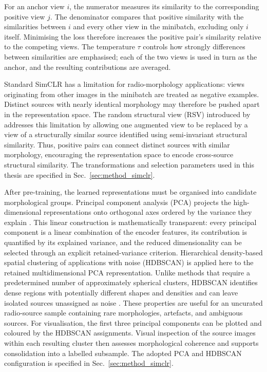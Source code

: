 For an anchor view \(i\), the numerator measures its similarity to the corresponding positive view \(j\). The denominator compares that positive similarity with the similarities between \(i\) and every other view in the minibatch, excluding only \(i\) itself. Minimising the loss therefore increases the positive pair's similarity relative to the competing views. The temperature \(\tau\) controls how strongly differences between similarities are emphasised; each of the two views is used in turn as the anchor, and the resulting contributions are averaged.

Standard SimCLR has a limitation for radio-morphology applications: views originating from other images in the minibatch are treated as negative examples.
Distinct sources with nearly identical morphology may therefore be pushed apart in the representation space.
The random structural view (RSV) introduced by \citet{Nicolas2025} addresses this limitation by allowing one augmented view to be replaced by a view of a structurally similar source identified using semi-invariant structural similarity.
Thus, positive pairs can connect distinct sources with similar morphology, encouraging the representation space to encode cross-source structural similarity.
The transformations and selection parameters used in this thesis are specified in Sec.~\ref{sec:method_simclr}.

After pre-training, the learned representations must be organised into candidate morphological groups.
Principal component analysis (PCA) projects the high-dimensional representations onto orthogonal axes ordered by the variance they explain \citep{Jolliffe2016}.
This linear construction is mathematically transparent: every principal component is a linear combination of the encoder features, its contribution is quantified by its explained variance, and the reduced dimensionality can be selected through an explicit retained-variance criterion.
Hierarchical density-based spatial clustering of applications with noise (HDBSCAN) is applied here to the retained multidimensional PCA representation.
Unlike methods that require a predetermined number of approximately spherical clusters, HDBSCAN identifies dense regions with potentially different shapes and densities and can leave isolated sources unassigned as noise \citep{Campello2013,McInnes2017}.
These properties are useful for an uncurated radio-source sample containing rare morphologies, artefacts, and ambiguous sources. 
For visualisation, the first three principal components can be plotted and coloured by the HDBSCAN assignments. 
Visual inspection of the source images within each resulting cluster then assesses morphological coherence and supports consolidation into a labelled subsample. 
The adopted PCA and HDBSCAN configuration is specified in Sec.~\ref{sec:method_simclr}.

